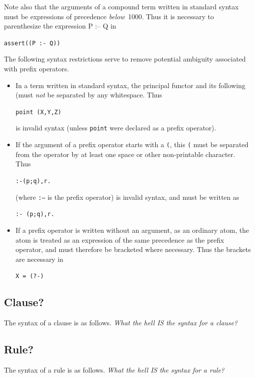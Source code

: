 Note also that the arguments of a compound term written in
standard syntax must be expressions of precedence {\em below}~1000.
Thus it is necessary to parenthesize the expression P :-- Q in
\begin{center}
{\tt assert((P :- Q))}
\end{center}
The following syntax restrictions serve to remove
potential ambiguity associated with prefix operators.
\begin{itemize}
\item
    In a term written in standard syntax, the principal functor and
    its following (must {\em not} be separated by any whitespace.
    Thus
    \begin{center}
    {\tt point (X,Y,Z)}
    \end{center}
    is invalid syntax (unless {\tt point} were declared as a prefix operator).

\item
    If the argument of a prefix operator starts with a {\tt (}, this {\tt(}
    must be separated from the operator by at least one space or other
    non-printable character.
    Thus
    \begin{center}
    {\tt :-(p;q),r.}
    \end{center}
    (where {\tt :--} is the prefix operator) is invalid syntax,
    and must be written as
    \begin{center}
    {\tt :- (p;q),r.}
    \end{center}

\item
    If a prefix operator is written without an argument, as an ordinary atom,
    the atom is treated as an expression of the same precedence
    as the prefix operator, and must therefore be bracketed where necessary.
    Thus the brackets are necessary in\\
\begin{center}
{\tt X = (?-)}
\end{center}
\end{itemize}

\subsection{Clause?}\label{clause}
The syntax of a clause is as follows.
{\em What the hell IS the syntax for a clause?}

\subsection{Rule?}\label{rule}
The syntax of a rule is as follows.
{\em What the hell IS the syntax for a rule?}

